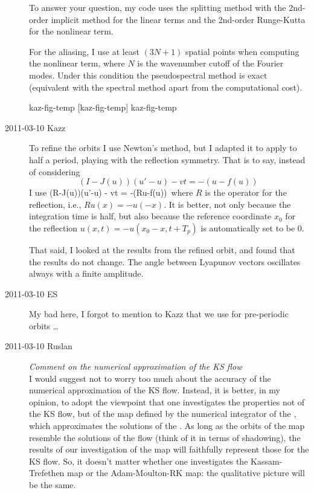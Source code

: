 \begin{description}
  To answer your question, my code uses the splitting method with the
  2nd-order implicit method
  for the linear terms and the 2nd-order Runge-Kutta
  for the nonlinear term.

  For the aliasing, I use at least $(3N+1)$ spatial points when computing
  the nonlinear term, where $N$ is the wavenumber cutoff of the Fourier modes.
  Under this condition the pseudospectral method is exact
  (equivalent with the spectral method apart from the computational cost).

  {kaz-fig-temp}   %
  {}   %
  {    %
    {\po}  [kaz-fig-temp]
  }
  {kaz-fig-temp}   %

\item[2011-03-10 Kazz] To refine the orbits I use Newton's method,
  but I adapted it to apply to half a period, playing with the reflection
  symmetry. That is to say, instead of considering
  \[
    (I-J(u))(u'-u) - vt = -(u-f(u))\,
  \]
  I use
  \beq
  (R-J(u))(u'-u) - vt = -(Ru-f(u))\,
   where $R$ is the operator
  for the reflection, i.e., $Ru(x) = -u(-x)$.
  It is better, not only because the integration time is half, but also because
  the reference coordinate $x_0$ for the reflection $u(x,t)=-u(x_0-x,t+T_p)$
  is automatically set to be 0.

  That said, I looked at the results from the refined orbit, and found
  that the results do not change. The angle between {\transient} Lyapunov vectors oscillates
  always with a finite amplitude.

\item[2011-03-10 ES] My bad here, I forgot to mention to Kazz that we
  use  for pre-periodic orbits \ldots

\item[2011-03-10 Ruslan] {\em Comment on the numerical approximation of the KS flow}\\
  I would suggest not to worry too much about the accuracy of the numerical
  approximation of the KS flow.  Instead, it is better, in my opinion, to
  adopt the viewpoint that one investigates the properties not of the KS
  flow, but of the map defined by the numerical integrator of the \KSe,
  which approximates the solutions of the \KSe.  As long as the orbits of
  the map resemble the solutions of the flow (think of it in terms of
  shadowing), the results of our investigation of the map will faithfully
  represent those for the KS flow.  So, it doesn't matter whether one
  investigates the Kassam-Trefethen map or the Adam-Moulton-RK map: the
  qualitative picture will be the same.


\end{description}
